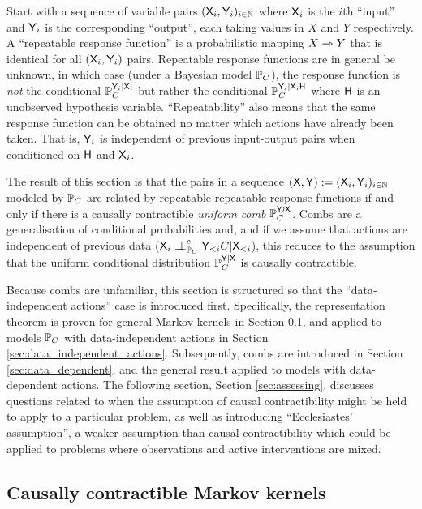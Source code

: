 Start with a sequence of variable pairs $(\mathsf{X}_i,\mathsf{Y}_i)_{i\in \mathbb{N}}$ where $\mathsf{X}_i$ is the $i$th ``input'' and $\mathsf{Y}_i$ is the corresponding ``output'', each taking values in $X$ and $Y$ respectively. A ``repeatable response function'' is a probabilistic mapping $X\rightarrowtriangle Y$ that is identical for all $(\mathsf{X}_i,\mathsf{Y}_i)$ pairs. Repeatable response functions are in general be unknown, in which case (under a Bayesian model $\mathbb{P}_C$), the response function is \emph{not} the conditional $\mathbb{P}_C^{\mathsf{Y}_i|\mathsf{X}_i}$ but rather the conditional $\mathbb{P}_C^{\mathsf{Y}_i|\mathsf{X}_i\mathsf{H}}$ where $\mathsf{H}$ is an unobserved hypothesis variable. ``Repeatability'' also means that the same response function can be obtained no matter which actions have already been taken. That is, $\mathsf{Y}_i$ is independent of previous input-output pairs when conditioned on $\mathsf{H}$ and $\mathsf{X}_i$.

The result of this section is that the pairs in a sequence $(\mathsf{X},\mathsf{Y}):=(\mathsf{X}_i,\mathsf{Y}_i)_{i\in \mathbb{N}}$ modeled by $\mathbb{P}_C$ are related by repeatable repeatable response functions if and only if there is a causally contractible \emph{uniform comb} $\mathbb{P}_C^{\mathsf{Y}\wr\mathsf{X}}$. Combs are a generalisation of conditional probabilities and, and if we assume that actions are independent of previous data ($\RV{X}_i\CI_{\prob{P}_C}^e \RV{Y}_{<i} C|\RV{X}_{<i}$), this reduces to the assumption that the uniform conditional distribution $\mathbb{P}_C^{\mathsf{Y}|\mathsf{X}}$ is causally contractible.

Because combs are unfamiliar, this section is structured so that the ``data-independent actions'' case is introduced first. Specifically, the representation theorem is proven for general Markov kernels in Section \ref{sec:ccontracibility}, and applied to models $\mathbb{P}_C$ with data-independent actions in Section \ref{sec:data_independent_actions}. Subsequently, combs are introduced in Section \ref{sec:data_dependent}, and the general result applied to models with data-dependent actions. The following section, Section \ref{sec:assessing}, discusses questions related to when the assumption of causal contractibility might be held to apply to a particular problem, as well as introducing ``Ecclesiastes' assumption'', a weaker assumption than causal contractibility which could be applied to problems where observations and active interventions are mixed.


\subsection{Causally contractible Markov kernels}\label{sec:ccontracibility}

